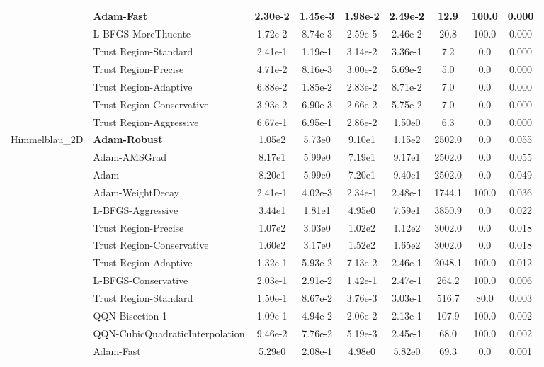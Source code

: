 \documentclass[10pt]{article}
\begin{document}
\begin{longtable}{|l|l|c|c|c|c|c|c|c|}
\hline
 & Adam-Fast & 2.30e-2 & 1.45e-3 & 1.98e-2 & 2.49e-2 & 12.9 & 100.0 & 0.000 \\
\hline
 & L-BFGS-MoreThuente & 1.72e-2 & 8.74e-3 & 2.59e-5 & 2.46e-2 & 20.8 & 100.0 & 0.000 \\
\hline
 & Trust Region-Standard & 2.41e-1 & 1.19e-1 & 3.14e-2 & 3.36e-1 & 7.2 & 0.0 & 0.000 \\
\hline
 & Trust Region-Precise & 4.71e-2 & 8.16e-3 & 3.00e-2 & 5.69e-2 & 5.0 & 0.0 & 0.000 \\
\hline
 & Trust Region-Adaptive & 6.88e-2 & 1.85e-2 & 2.83e-2 & 8.71e-2 & 7.0 & 0.0 & 0.000 \\
\hline
 & Trust Region-Conservative & 3.93e-2 & 6.90e-3 & 2.66e-2 & 5.75e-2 & 7.0 & 0.0 & 0.000 \\
\hline
 & Trust Region-Aggressive & 6.67e-1 & 6.95e-1 & 2.86e-2 & 1.50e0 & 6.3 & 0.0 & 0.000 \\
Himmelblau\_2D & \textbf{Adam-Robust} & 1.05e2 & 5.73e0 & 9.10e1 & 1.15e2 & 2502.0 & 0.0 & 0.055 \\
\hline
 & Adam-AMSGrad & 8.17e1 & 5.99e0 & 7.19e1 & 9.17e1 & 2502.0 & 0.0 & 0.055 \\
\hline
 & Adam & 8.20e1 & 5.99e0 & 7.20e1 & 9.40e1 & 2502.0 & 0.0 & 0.049 \\
\hline
 & Adam-WeightDecay & 2.41e-1 & 4.02e-3 & 2.34e-1 & 2.48e-1 & 1744.1 & 100.0 & 0.036 \\
\hline
 & L-BFGS-Aggressive & 3.44e1 & 1.81e1 & 4.95e0 & 7.59e1 & 3850.9 & 0.0 & 0.022 \\
\hline
 & Trust Region-Precise & 1.07e2 & 3.03e0 & 1.02e2 & 1.12e2 & 3002.0 & 0.0 & 0.018 \\
\hline
 & Trust Region-Conservative & 1.60e2 & 3.17e0 & 1.52e2 & 1.65e2 & 3002.0 & 0.0 & 0.018 \\
\hline
 & Trust Region-Adaptive & 1.32e-1 & 5.93e-2 & 7.13e-2 & 2.46e-1 & 2048.1 & 100.0 & 0.012 \\
\hline
 & L-BFGS-Conservative & 2.03e-1 & 2.91e-2 & 1.42e-1 & 2.47e-1 & 264.2 & 100.0 & 0.006 \\
\hline
 & Trust Region-Standard & 1.50e-1 & 8.67e-2 & 3.76e-3 & 3.03e-1 & 516.7 & 80.0 & 0.003 \\
\hline
 & QQN-Bisection-1 & 1.09e-1 & 4.94e-2 & 2.06e-2 & 2.13e-1 & 107.9 & 100.0 & 0.002 \\
\hline
 & QQN-CubicQuadraticInterpolation & 9.46e-2 & 7.76e-2 & 5.19e-3 & 2.45e-1 & 68.0 & 100.0 & 0.002 \\
\hline
 & Adam-Fast & 5.29e0 & 2.08e-1 & 4.98e0 & 5.82e0 & 69.3 & 0.0 & 0.001 \\

\end{longtable}
\end{document}

